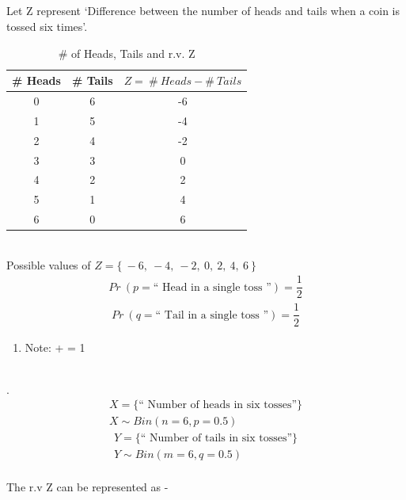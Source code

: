 \documentclass[journal,12pt,twocolumn]{IEEEtran}
\begin{document}
\subsection*{}
Let Z represent `Difference between the number of heads and tails when a coin is tossed six times'.\\
\begin{table}[ht]
\centering
\begin{tabular}{c c c}
\hline\hline
\# Heads  & \# Tails  & $Z =\ \#\ Heads - \#\ Tails $\\ [0.5ex]
\hline\hline
0  & 6  & -6 \\
\hline
1  & 5  & -4 \\
\hline
2  & 4  & -2 \\
\hline
3  & 3  & 0 \\
\hline
4  & 2  & 2 \\ 
\hline
5  & 1  & 4 \\
\hline
6  & 0  & 6 \\[1ex]
\hline\hline 
\end{tabular}
\label{table:nonlin}
\caption{\# of Heads, Tails and r.v. Z}
\end{table}
\\Possible values of $Z = \{\ -6,\ -4,\ -2,\ 0,\ 2,\ 4,\ 6\ \}$\\
\begin{align}
    Pr\ (p=\text{`` Head in a single toss ''}) = \dfrac{1}{2}
\end{align}
\begin{align}
    Pr\ (q=\text{`` Tail in a single toss ''}) =  \dfrac{1}{2}
\end{align}
\begin{enumerate}
    \item Note:  +  = 1\\\\
\end{enumerate}
.
\begin{multline}
    X = \{ \text{`` Number of heads in six tosses''} \}\\
    X \sim Bin(n=6, p=0.5)
\end{multline}
\begin{multline}
    Y = \{ \text{`` Number of tails in six tosses''} \}\\
    Y \sim Bin(m=6, q=0.5)
\end{multline}
\\
The r.v Z can be represented as -\\
\end{document}
